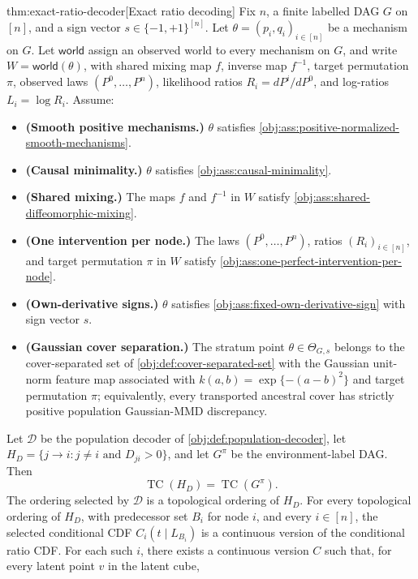 \begin{theoremv}{thm:exact-ratio-decoder}[Exact ratio decoding]
Fix \(n\), a finite labelled DAG \(G\) on \([n]\), and a sign vector \(s\in\{-1,+1\}^{[n]}\). Let \(\theta=(p_i,q_i)_{i\in[n]}\) be a mechanism on \(G\). Let \(\mathsf{world}\) assign an observed world to every mechanism on \(G\), and write \(W=\mathsf{world}(\theta)\), with shared mixing map \(f\), inverse map \(f^{-1}\), target permutation \(\pi\), observed laws \((P^0,\ldots,P^n)\), likelihood ratios \(R_i=dP^i/dP^0\), and log-ratios \(L_i=\log R_i\). Assume:
\begin{itemize}
\item \textbf{(Smooth positive mechanisms.)} \(\theta\) satisfies \cref{obj:ass:positive-normalized-smooth-mechanisms}.
\item \textbf{(Causal minimality.)} \(\theta\) satisfies \cref{obj:ass:causal-minimality}.
\item \textbf{(Shared mixing.)} The maps \(f\) and \(f^{-1}\) in \(W\) satisfy \cref{obj:ass:shared-diffeomorphic-mixing}.
\item \textbf{(One intervention per node.)} The laws \((P^0,\ldots,P^n)\), ratios \((R_i)_{i\in[n]}\), and target permutation \(\pi\) in \(W\) satisfy \cref{obj:ass:one-perfect-intervention-per-node}.
\item \textbf{(Own-derivative signs.)} \(\theta\) satisfies \cref{obj:ass:fixed-own-derivative-sign} with sign vector \(s\).
\item \textbf{(Gaussian cover separation.)} The stratum point \(\theta\in\Theta_{G,s}\) belongs to the cover-separated set of \cref{obj:def:cover-separated-set} with the Gaussian unit-norm feature map associated with \(k(a,b)=\exp\{-(a-b)^2\}\) and target permutation \(\pi\); equivalently, every transported ancestral cover has strictly positive population Gaussian-MMD discrepancy.
\end{itemize}
Let \(\mathscr D\) be the population decoder of \cref{obj:def:population-decoder}, let \(H_D=\{j\to i:j\ne i\text{ and }D_{ji}>0\}\), and let \(G^\pi\) be the environment-label DAG. Then
\[
\operatorname{TC}(H_D)=\operatorname{TC}(G^\pi).
\]
The ordering selected by \(\mathscr D\) is a topological ordering of \(H_D\). For every topological ordering of \(H_D\), with predecessor set \(B_i\) for node \(i\), and every \(i\in[n]\), the selected conditional CDF \(C_i(t\mid L_{B_i})\) is a continuous version of the conditional ratio CDF. For each such \(i\), there exists a continuous version \(C\) such that, for every latent point \(v\) in the latent cube,

\end{theoremv}
